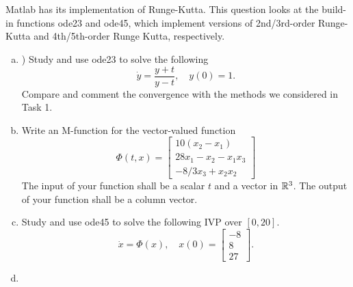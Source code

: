 \section{}
Matlab has its implementation of Runge-Kutta.
This question looks at the build-in functions {\color{blue}ode23} and {\color{blue}ode45}, which implement versions of 2nd/3rd-order Runge-Kutta and 4th/5th-order Runge Kutta, respectively.
\begin{enumerate}[(a)]
	\item ) Study and use {\color{blue}ode23} to solve the following
	\[ \dot{y}=\frac{y+t}{y-t}, \quad y(0)=1. \]
	Compare and comment the convergence with the methods we considered in Task 1.
	\item Write an M-function for the vector-valued function
	\[ \Phi(t,x)=\begin{bmatrix} 10(x_2-x_1) \\ 28x_1-x_2-x_1x_3 \\ -8/3x_3+x_2x_2 \end{bmatrix} \]
	The input of your function shall be a scalar \(t\) and a vector in \(\mathbb{R}^3\).
	The output of your function shall be a column vector.
	\item  Study and use {\color{blue}ode45} to solve the following IVP over \([0, 20]\).
	\[ \dot{x}=\Phi(x), \quad x(0)=\begin{bmatrix} -8 \\ 8 \\ 27 \end{bmatrix}. \]
	\item 
\end{enumerate}